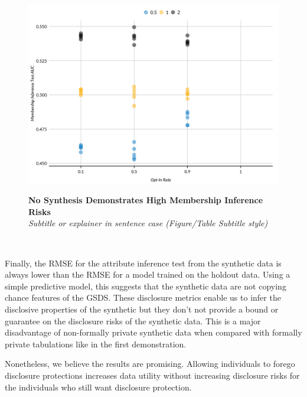 \documentclass[
]{urban-formatting}
\begin{document}
\begin{figure}[htbp]
    \caption{
    \textbf{No Synthesis Demonstrates High Membership Inference Risks}\\
    \textit{Subtitle or explainer in sentence case (Figure/Table Subtitle style)}
    }
    \centering
    \includegraphics[width=6.5in]{../analysis/figures/membership-inference-1.png}
    \label{fig:membership}
\end{figure}
\begin{singlespace}
    \\
\end{singlespace}

Finally, the RMSE for the attribute inference test from the synthetic
data is always lower than the RMSE for a model trained on the holdout
data. Using a simple predictive model, this suggests that the synthetic
data are not copying chance features of the GSDS. These disclosure
metrics enable us to infer the disclosive properties of the synthetic
but they don't not provide a bound or guarantee on the disclosure risks
of the synthetic data. This is a major disadvantage of non-formally
private synthetic data when compared with formally private tabulations
like in the first demonstration.

Nonetheless, we believe the results are promising. Allowing individuals
to forego disclosure protections increases data utility without
increasing disclosure risks for the individuals who still want
disclosure protection.
\end{document}
